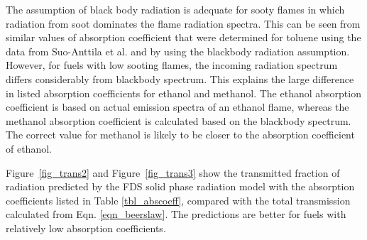 The assumption of black body radiation is adequate for sooty flames in which radiation from soot dominates the flame radiation spectra. This can be seen from similar values of absorption coefficient that were determined for toluene using the data from Suo-Anttila et al. and by using the blackbody radiation assumption. However, for fuels with low sooting flames, the incoming radiation spectrum differs considerably from blackbody spectrum. This explains the large difference in listed absorption coefficients for ethanol and methanol. The ethanol absorption coefficient is based on actual emission spectra of an ethanol flame, whereas the methanol absorption coefficient is calculated based on the blackbody spectrum. The correct value for methanol is likely to be closer to the absorption coefficient of ethanol.

Figure~\ref{fig_trans2} and Figure~\ref{fig_trans3} show the transmitted fraction of radiation predicted by the FDS solid phase radiation model with the absorption coefficients listed in Table \ref{tbl_abscoeff}, compared with the total transmission calculated from Eqn. \ref{eqn_beerslaw}. The predictions are better for fuels with relatively low absorption coefficients.

